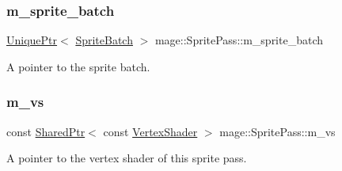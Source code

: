\subsubsection{\texorpdfstring{m\+\_\+sprite\+\_\+batch}{m\_sprite\_batch}}
{\footnotesize\ttfamily \hyperlink{namespacemage_a3316d7143a973e37adf1110f2e80ca31}{Unique\+Ptr}$<$ \hyperlink{classmage_1_1_sprite_batch}{Sprite\+Batch} $>$ mage\+::\+Sprite\+Pass\+::m\+\_\+sprite\+\_\+batch\hspace{0.3cm}{\ttfamily [private]}}

A pointer to the sprite batch. \hypertarget{classmage_1_1_sprite_pass_ac6e86ad76e04aa3d2e266e9491d17f81}{}\label{classmage_1_1_sprite_pass_ac6e86ad76e04aa3d2e266e9491d17f81} 
\subsubsection{\texorpdfstring{m\+\_\+vs}{m\_vs}}
{\footnotesize\ttfamily const \hyperlink{namespacemage_a1e01ae66713838a7a67d30e44c67703e}{Shared\+Ptr}$<$ const \hyperlink{classmage_1_1_vertex_shader}{Vertex\+Shader} $>$ mage\+::\+Sprite\+Pass\+::m\+\_\+vs\hspace{0.3cm}{\ttfamily [private]}}

A pointer to the vertex shader of this sprite pass. 